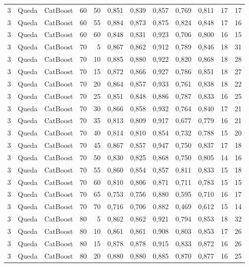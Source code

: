 \begin{longtable}{ccclrrrrrrrr}
3 & Queda & CatBoost & 60 & 50 & 0,851 & 0,839 & 0,857 & 0,769 & 0,811 & 17 & 17 \\
3 & Queda & CatBoost & 60 & 55 & 0,884 & 0,873 & 0,875 & 0,824 & 0,848 & 17 & 16 \\
3 & Queda & CatBoost & 60 & 60 & 0,848 & 0,831 & 0,923 & 0,706 & 0,800 & 16 & 15 \\
3 & Queda & CatBoost & 70 & 5 & 0,867 & 0,862 & 0,912 & 0,789 & 0,846 & 18 & 31 \\
3 & Queda & CatBoost & 70 & 10 & 0,885 & 0,880 & 0,922 & 0,820 & 0,868 & 18 & 28 \\
3 & Queda & CatBoost & 70 & 15 & 0,872 & 0,866 & 0,927 & 0,786 & 0,851 & 18 & 27 \\
3 & Queda & CatBoost & 70 & 20 & 0,864 & 0,857 & 0,933 & 0,761 & 0,838 & 18 & 22 \\
3 & Queda & CatBoost & 70 & 25 & 0,851 & 0,848 & 0,886 & 0,787 & 0,833 & 16 & 25 \\
3 & Queda & CatBoost & 70 & 30 & 0,866 & 0,858 & 0,932 & 0,764 & 0,840 & 17 & 21 \\
3 & Queda & CatBoost & 70 & 35 & 0,813 & 0,809 & 0,917 & 0,677 & 0,779 & 16 & 21 \\
3 & Queda & CatBoost & 70 & 40 & 0,814 & 0,810 & 0,854 & 0,732 & 0,788 & 15 & 20 \\
3 & Queda & CatBoost & 70 & 45 & 0,867 & 0,857 & 0,947 & 0,750 & 0,837 & 17 & 18 \\
3 & Queda & CatBoost & 70 & 50 & 0,830 & 0,825 & 0,868 & 0,750 & 0,805 & 14 & 16 \\
3 & Queda & CatBoost & 70 & 55 & 0,860 & 0,854 & 0,857 & 0,811 & 0,833 & 15 & 18 \\
3 & Queda & CatBoost & 70 & 60 & 0,810 & 0,806 & 0,871 & 0,711 & 0,783 & 15 & 15 \\
3 & Queda & CatBoost & 70 & 65 & 0,753 & 0,756 & 0,880 & 0,595 & 0,710 & 16 & 17 \\
3 & Queda & CatBoost & 70 & 70 & 0,716 & 0,706 & 0,882 & 0,469 & 0,612 & 15 & 14 \\
3 & Queda & CatBoost & 80 & 5 & 0,862 & 0,862 & 0,921 & 0,794 & 0,853 & 18 & 32 \\
3 & Queda & CatBoost & 80 & 10 & 0,861 & 0,861 & 0,908 & 0,803 & 0,853 & 17 & 26 \\
3 & Queda & CatBoost & 80 & 15 & 0,878 & 0,878 & 0,915 & 0,833 & 0,872 & 16 & 26 \\
3 & Queda & CatBoost & 80 & 20 & 0,880 & 0,880 & 0,885 & 0,870 & 0,877 & 16 & 25 \\

\end{longtable}
